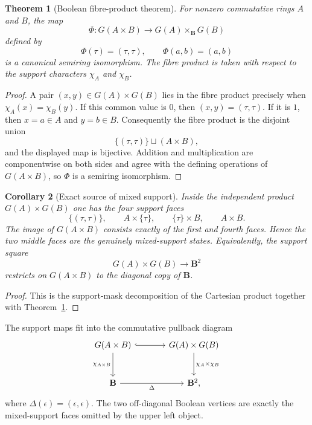 \documentclass[11pt]{amsart}
\numberwithin{equation}{section}
\newtheorem{theorem}{Theorem}[section]
\newtheorem{corollary}[theorem]{Corollary}
\theoremstyle{definition}
\newcommand{\B}{\mathbf B}
\begin{document}
\begin{theorem}[Boolean fibre-product theorem]
\label{thm:boolean-fibre-product}
For nonzero commutative rings $A$ and $B$, the map
\[
\Phi:G(A\times B)\longrightarrow G(A)\times_{\B}G(B)
\]
defined by
\[
\Phi(\tau)=(\tau,\tau),
\qquad
\Phi(a,b)=(a,b)
\]
is a canonical semiring isomorphism.  The fibre product is taken with
respect to the support characters $\chi_A$ and $\chi_B$.
\end{theorem}

\begin{proof}
A pair $(x,y)\in G(A)\times G(B)$ lies in the fibre product precisely when
$\chi_A(x)=\chi_B(y)$.  If this common value is $0$, then
$(x,y)=(\tau,\tau)$.  If it is $1$, then $x=a\in A$ and $y=b\in B$.
Consequently the fibre product is the disjoint union
\[
\{(\tau,\tau)\}\sqcup(A\times B),
\]
and the displayed map is bijective.  Addition and multiplication are
componentwise on both sides and agree with the defining operations of
$G(A\times B)$, so $\Phi$ is a semiring isomorphism.
\end{proof}

\begin{corollary}[Exact source of mixed support]
\label{cor:mixed-support-source}
Inside the independent product $G(A)\times G(B)$ one has the four support
faces
\[
\{(\tau,\tau)\},\qquad A\times\{\tau\},\qquad
\{\tau\}\times B,\qquad A\times B.
\]
The image of $G(A\times B)$ consists exactly of the first and fourth
faces.  Hence the two middle faces are the genuinely mixed-support states.
Equivalently, the support square
\[
G(A)\times G(B)\longrightarrow\B^2
\]
restricts on $G(A\times B)$ to the diagonal copy of $\B$.
\end{corollary}

\begin{proof}
This is the support-mask decomposition of the Cartesian product together
with Theorem~\ref{thm:boolean-fibre-product}.
\end{proof}

The support maps fit into the commutative pullback diagram
\[
\begin{tikzcd}[column sep=large,row sep=large]
G(A\times B) \arrow[r,hook] \arrow[d,"\chi_{A\times B}"']
& G(A)\times G(B) \arrow[d,"\chi_A\times\chi_B"]\\
\B \arrow[r,"\Delta"'] & \B^2,
\end{tikzcd}
\]
where $\Delta(\epsilon)=(\epsilon,\epsilon)$.  The two off-diagonal
Boolean vertices are exactly the mixed-support faces omitted by the upper
left object.
\end{document}
